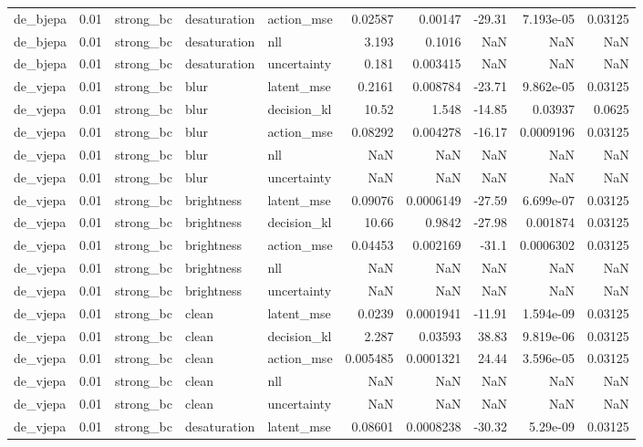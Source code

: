 \begin{tabular}{lrlllrrrrr}
de\_bjepa & 0.01 & strong\_bc & desaturation & action\_mse & 0.02587 & 0.00147 & -29.31 & 7.193e-05 & 0.03125 \\
de\_bjepa & 0.01 & strong\_bc & desaturation & nll & 3.193 & 0.1016 & NaN & NaN & NaN \\
de\_bjepa & 0.01 & strong\_bc & desaturation & uncertainty & 0.181 & 0.003415 & NaN & NaN & NaN \\
de\_vjepa & 0.01 & strong\_bc & blur & latent\_mse & 0.2161 & 0.008784 & -23.71 & 9.862e-05 & 0.03125 \\
de\_vjepa & 0.01 & strong\_bc & blur & decision\_kl & 10.52 & 1.548 & -14.85 & 0.03937 & 0.0625 \\
de\_vjepa & 0.01 & strong\_bc & blur & action\_mse & 0.08292 & 0.004278 & -16.17 & 0.0009196 & 0.03125 \\
de\_vjepa & 0.01 & strong\_bc & blur & nll & NaN & NaN & NaN & NaN & NaN \\
de\_vjepa & 0.01 & strong\_bc & blur & uncertainty & NaN & NaN & NaN & NaN & NaN \\
de\_vjepa & 0.01 & strong\_bc & brightness & latent\_mse & 0.09076 & 0.0006149 & -27.59 & 6.699e-07 & 0.03125 \\
de\_vjepa & 0.01 & strong\_bc & brightness & decision\_kl & 10.66 & 0.9842 & -27.98 & 0.001874 & 0.03125 \\
de\_vjepa & 0.01 & strong\_bc & brightness & action\_mse & 0.04453 & 0.002169 & -31.1 & 0.0006302 & 0.03125 \\
de\_vjepa & 0.01 & strong\_bc & brightness & nll & NaN & NaN & NaN & NaN & NaN \\
de\_vjepa & 0.01 & strong\_bc & brightness & uncertainty & NaN & NaN & NaN & NaN & NaN \\
de\_vjepa & 0.01 & strong\_bc & clean & latent\_mse & 0.0239 & 0.0001941 & -11.91 & 1.594e-09 & 0.03125 \\
de\_vjepa & 0.01 & strong\_bc & clean & decision\_kl & 2.287 & 0.03593 & 38.83 & 9.819e-06 & 0.03125 \\
de\_vjepa & 0.01 & strong\_bc & clean & action\_mse & 0.005485 & 0.0001321 & 24.44 & 3.596e-05 & 0.03125 \\
de\_vjepa & 0.01 & strong\_bc & clean & nll & NaN & NaN & NaN & NaN & NaN \\
de\_vjepa & 0.01 & strong\_bc & clean & uncertainty & NaN & NaN & NaN & NaN & NaN \\
de\_vjepa & 0.01 & strong\_bc & desaturation & latent\_mse & 0.08601 & 0.0008238 & -30.32 & 5.29e-09 & 0.03125 \\

\end{tabular}
